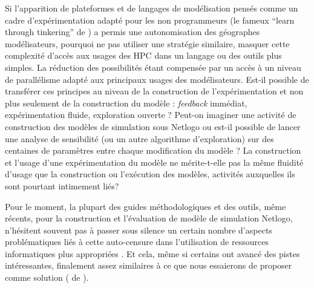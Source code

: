 
Si l'apparition de plateformes et de langages de modélisation pensés comme un cadre d'expérimentation adapté pour les non programmeurs (le fameux \foreignquote{english}{learn through tinkering} de \textcite{Restnick2013}) a permis une autonomisation des géographes modélisateurs, pourquoi ne pas utiliser une stratégie similaire, masquer cette complexité d'accès aux usages des HPC dans un langage ou des outils plus simples. La réduction des possibilités étant  compensée par un accès à un niveau de parallélisme adapté aux principaux usages des modélisateurs. Est-il possible de transférer ces principes au niveau de la construction de l'expérimentation et non plus seulement de la construction du modèle : \textit{feedback} immédiat, expérimentation fluide, exploration ouverte ? Peut-on imaginer une activité de construction des modèles de simulation sous Netlogo ou est-il possible de lancer une analyse de sensibilité (ou un autre algorithme d'exploration) sur des centaines de paramètres entre chaque modification du modèle ? La construction et l'usage d'une expérimentation du modèle ne mérite-t-elle pas la même fluidité d'usage que la construction ou l'exécution des modèles, activités auxquelles ils sont pourtant intimement liés?

Pour le moment, la plupart des guides méthodologiques et des outils, même récents, pour la construction et l'évaluation de modèle de simulation Netlogo, n'hésitent souvent pas à passer sous silence un certain nombre d'aspects problématiques liés à cette auto-censure dans l'utilisation de ressources informatiques plus appropriées \autocites{Gilbert2008, Grimm2011a}. Et cela, même si certains ont avancé des pistes intéressantes, finalement assez similaires à ce que nous essaierons de proposer comme solution (\textcite{Behavior Search} de \textcite{Stonedahl2011a}). %

